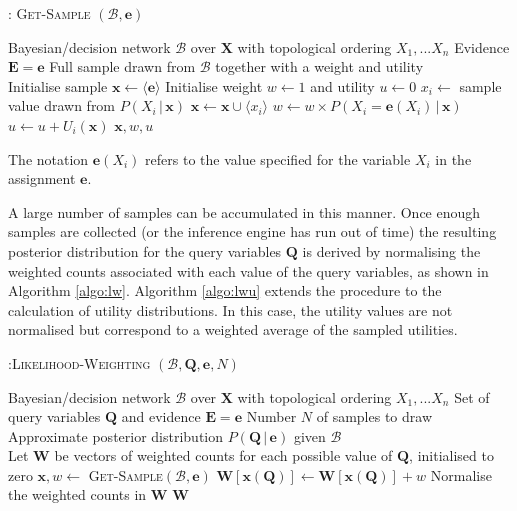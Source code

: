 \begin{algorithm}[h!]
\caption{: \textsc{Get-Sample} $(\mathcal{B}, \mathbf{e})$}
\begin{algorithmic}[1] \vspace{2mm} 
\REQUIRE Bayesian/decision network $\mathcal{B}$ over $\mathbf{X}$ with topological ordering $X_1,...X_n$
\REQUIRE Evidence $\mathbf{E} =\mathbf{e}$
\ENSURE Full sample drawn from $\mathcal{B}$ together with a weight and utility \\[2mm]
\STATE Initialise sample $\mathbf{x} \leftarrow \langle \mathbf{e} \rangle$
\STATE Initialise weight $w \leftarrow 1$ and utility $u \leftarrow 0$
\STATE $x_i \leftarrow$ sample value drawn from $P(X_i  \, | \,  \mathbf{x})$
\STATE $\mathbf{x} \leftarrow \mathbf{x} \cup \langle x_i \rangle$
\STATE $w \leftarrow w \times P\left(X_i = \mathbf{e}(X_i)  \, | \,  \mathbf{x}\right)$
\STATE $u \leftarrow u + U_i(\mathbf{x})$
\ENDIF
\ENDFOR
\RETURN $\mathbf{x}, w, u$
\end{algorithmic}
\label{algo:getsample}
\end{algorithm}

The notation $\mathbf{e}(X_i)$ refers to the value specified for the variable $X_i$ in the assignment $\mathbf{e}$. 

A large number of samples can be accumulated in this manner. Once enough samples are collected (or the inference engine has run out of time) the resulting posterior distribution for the query variables $\mathbf{Q}$ is derived by normalising the weighted counts associated with each value of the query variables, as shown in Algorithm \ref{algo:lw}. Algorithm \ref{algo:lwu} extends the procedure to the calculation of utility distributions. In this case, the utility values are not normalised but correspond to a weighted average of the sampled utilities. 

\begin{algorithm}[h]
\caption{:\textsc{Likelihood-Weighting} $(\mathcal{B},\mathbf{Q}, \mathbf{e}, N)$}
\begin{algorithmic} \vspace{2mm} 
\REQUIRE Bayesian/decision network $\mathcal{B}$ over $\mathbf{X}$ with topological ordering $X_1,...X_n$
\REQUIRE Set of query variables $\mathbf{Q}$ and evidence $\mathbf{E} =\mathbf{e}$
\REQUIRE Number $N$ of samples to draw
\ENSURE Approximate posterior distribution $P(\mathbf{Q} \, | \, \mathbf{e})$ given $\mathcal{B}$ \\[2mm]
\STATE Let $\mathbf{W}$ be vectors of weighted counts for each possible value of $\mathbf{Q}$, initialised to zero
\STATE $\mathbf{x}, w \leftarrow $ \textsc{Get-Sample}$(\mathcal{B}, \mathbf{e})$ 
\STATE $\mathbf{W}[\mathbf{x}(\mathbf{Q})] \leftarrow \mathbf{W}[\mathbf{x}(\mathbf{Q})] + w$
\ENDFOR
\STATE Normalise the weighted counts in $\mathbf{W}$
\RETURN $\mathbf{W}$  \vspace{1mm} 
\end{algorithmic}
\label{algo:lw}
\end{algorithm}

